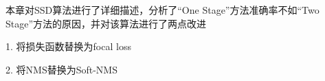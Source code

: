 本章对SSD算法进行了详细描述，分析了“One Stage”方法准确率不如“Two Stage”方法的原因，并对该算法进行了两点改进

1. 将损失函数替换为focal loss

2. 将NMS替换为Soft-NMS